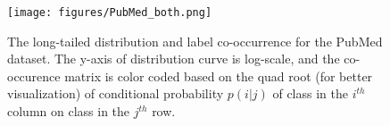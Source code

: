\documentclass[11pt]{article}
\begin{document}
\begin{figure}[t]\centering
    \texttt{[image: figures/PubMed\_both.png]}
    \caption{The long-tailed distribution and label co-occurrence for the PubMed dataset. 
The y-axis of distribution curve is log-scale, and the co-occurence matrix is color coded based on the quad root (for better visualization) of conditional probability $p(i|j)$ of class in the $i^{th}$ column on class in the $j^{th}$ row.}\label{fig:longtailed_pubmed}\end{figure}

\begin{comment}
\begin{figure}[t]\centering
    \texttt{[image: figures/PubMed\_label\_distribution.pdf]}
    \texttt{[image: figures/PubMed\_label\_cooccurence.png]}
    \caption{The long-tailed distribution and label co-occurrence for the PubMed dataset. 
The y-axis of distribution curve is log-scale, and the co-occurence matrix is color coded based on the quad root (for better visualization) of conditional probability $p(i|j)$ of class in the $i^{th}$ column on class in the $j^{th}$ row.}\label{fig:longtailed_pubmed}\end{figure}
\end{comment}
\end{document}
